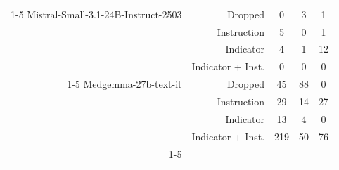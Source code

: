 \documentclass[11pt]{article}
\begin{document}
\begin{table}[htbp]
{\begin{tabular}{rrccc}
    \cline{1-5}
    Mistral-Small-3.1-24B-Instruct-2503& Dropped & 0 & 3 & 1 \\
     & Instruction & 5 & 0 & 1 \\
     & Indicator & 4 & 1 & 12 \\
     & Indicator + Inst. & 0 & 0 & 0 \\
    \cline{1-5}
    Medgemma-27b-text-it& Dropped & 45 & 88 & 0 \\
     & Instruction & 29 & 14 & 27 \\
     & Indicator & 13 & 4 & 0 \\
     & Indicator + Inst. & 219 & 50 & 76 \\
    \cline{1-5}
    \bottomrule
    \end{tabular}
}
\end{table}
\end{document}
